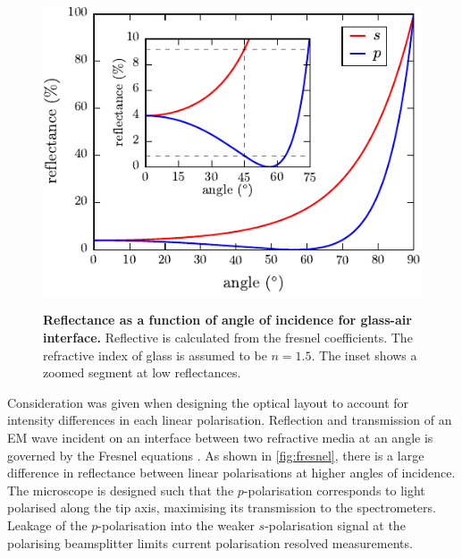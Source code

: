\documentclass[12pt, a4paper, oneside]{book}
\begin{document}
\begin{figure}
\vspace{-10pt}
\centering
{\includegraphics{figures/fresnel_coefficients}}
{\caption[Reflectance as a function of angle of incidence for glass-air interface]{\textbf{Reflectance as a function of angle of incidence for glass-air interface.} Reflective is calculated from the fresnel coefficients. The refractive index of glass is assumed to be $n=1.5$. The inset shows a zoomed segment at low reflectances.}
\label{fig:fresnel}}
\vspace{-5pt}
\end{figure}

Consideration was given when designing the optical layout to account for intensity differences in each linear polarisation. Reflection and transmission of an EM wave incident on an interface between two refractive media at an angle is governed by the Fresnel equations \cite{grant2013electromagnetism}. As shown in \autoref{fig:fresnel}, there is a large difference in reflectance between linear polarisations at higher angles of incidence. The microscope is designed such that the $p$-polarisation corresponds to light polarised along the tip axis, maximising its transmission to the spectrometers. Leakage of the $p$-polarisation into the weaker $s$-polarisation signal at the polarising beamsplitter limits current polarisation resolved measurements.

\end{document}
